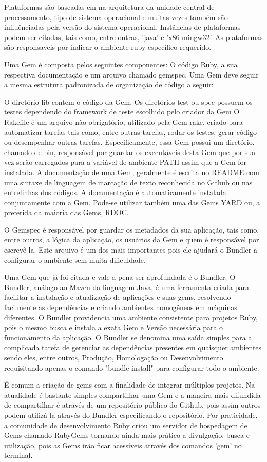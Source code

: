 Plataformas são baseadas em na arquitetura da unidade central de processamento, tipo de sistema operacional e muitas vezes também são influênciadas pela versão do sistema operacional. Instâncias de plataformas podem ser citadas, tais como, entre outras, 'java' e 'x86-mingw32'. As plataformas são responsaveis por indicar o ambiente ruby específico requerido.

Uma Gem é composta pelos seguintes componentes: O código Ruby, a sua respectiva documentação e um arquivo chamado gemspec. Uma Gem deve seguir a mesma estrutura padronizada de organização de código a seguir:



O diretório lib contem o código da Gem. Os diretórios test ou spec possuem os testes dependendo do framework de teste escolhido pelo criador da Gem
O Rakefile é um arquivo não obrigatório, utilizado pela Gem rake, criado para automatizar tarefas tais como, entre outras tarefas, rodar os testes, gerar código ou desempenhar outras tarefas. Especificamente, essa Gem possui um diretório, chamado de bin, responsável por guardar os executáveis desta Gem que por sua vez serão carregados para a variável de ambiente PATH assim que a Gem for instalada. A documentação de uma Gem, geralmente é escrita no README com uma sintaxe de linguagem de marcação de texto reconhecida no Github ou nas entrelinhas dos códigos. A documentação é automaticamente instalada conjuntamente com a Gem. Pode-se utilizar também uma das Gems YARD ou, a preferida da maioria das Gems, RDOC.

	O Gemspec é responsável por guardar os metadados da sua aplicação, tais como, entre outros, a lógica da aplicação, os usuários da Gem e quem é responsável por escrevê-la. Este arquivo é um dos mais importantes pois ele ajudará o Bundler a configurar o ambiente sem muita dificuldade.

Uma Gem que já foi citada e vale a pena ser aprofundada é o Bundler. O Bundler, análogo ao Maven da linguagem Java, é uma ferramenta criada para facilitar a instalação e atualização de aplicações e suas gems, resolvendo facilmente as dependências e criando ambientes homogêneos em máquinas diferentes. O Bundler providencia uma ambiente consistente para projetos Ruby, pois o mesmo busca e instala a exata Gem e Versão necessária para o funcionamento da aplicação. O Bundler se denomina uma saída simples para a complicada tarefa de gerenciar as dependências presentes em quaisquer ambientes sendo eles, entre outros, Produção, Homologação ou Desenvolvimento requisitando apenas o comando "bundle install" para configurar todo o ambiente.

É comum a criação de gems com a finalidade de integrar múltiplos projetos. Na atualidade é bastante simples compartilhar uma Gem e a maneira mais difundida de compartilhar é através de um repositório público do Github, pois assim outros podem utilizá-la através do Bundler especificando o repositório. Por praticidade, a comunidade de desenvolvimento Ruby criou um servidor de hospedagem de Gems chamado RubyGems tornando ainda mais prático a divulgação, busca e utilização, pois as Gems irão ficar acessíveis através dos comandos 'gem' no terminal.

